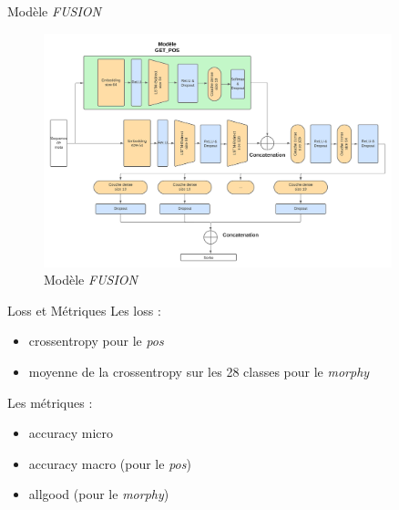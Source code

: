 \documentclass[11pt]{beamer}
\begin{document}
\begin{frame}{Modèle \textit{FUSION}}
    \begin{figure}[!ht]
        \centering
        \includegraphics[width=0.9\textwidth]{get_morphy_fusion.png}
        \caption{Modèle \textit{FUSION}}
        \label{fig: model fusion}
    \end{figure}
\end{frame}

\begin{frame}{Loss et Métriques}
    Les loss :
    \begin{itemize}
        \item crossentropy pour le \textit{pos}
        \item moyenne de la crossentropy sur les 28 classes pour le \textit{morphy}
    \end{itemize}
    Les métriques :
    \begin{itemize}
        \item accuracy micro
        \item accuracy macro (pour le \textit{pos})
        \item allgood (pour le \textit{morphy})
    \end{itemize}
\end{frame}
\end{document}
